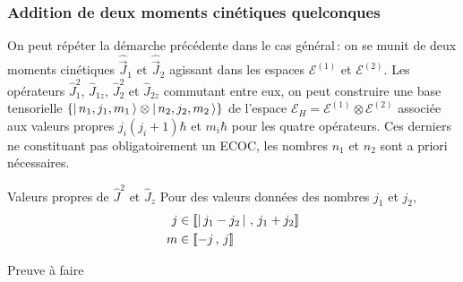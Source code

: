         \subsubsection{Addition de deux moments cinétiques quelconques}

        On peut répéter la démarche précédente dans le cas général : on se munit de deux moments cinétiques $\hat{\vec{J}}_1$ et $\hat{\vec{J}}_2$ agissant dans les espaces $\mathcal{E}^{(1)}$ et $\mathcal{E}^{(2)}$. Les opérateurs $\hat{J}_1^2$, $\hat{J}_{1z}$, $\hat{J}^2_2$ et $\hat{J}_{2z}$ commutant entre eux, on peut construire une base tensorielle $\left\{\left| \, n_1, j_1, m_1 \, \right> \otimes \left| \, n_2, j_2, m_2 \, \right>\right\}$ de l’espace $\mathcal{E}_H = \mathcal{E}^{(1)} \otimes \mathcal{E}^{(2)}$ associée  aux valeurs propres $j_{i}(j_i + 1)\hbar$ et $m_i \hbar$ pour les quatre opérateurs. Ces derniers ne constituant pas obligatoirement un ECOC, les nombres $n_1$ et $n_2$ sont a priori nécessaires.

        \begin{omed}{Valeurs propres de $\hat{J}^2$ et $\hat{J}_z$}
            Pour des valeurs données des nombres $j_1$ et $j_2$, 
            \begin{align*}
                j &\in \left[\!\left[ \left\lvert \, j_1 - j_2 \, \right\rvert \, , \, j_1 + j_2 \right]\!\right] \\
                m &\in \left[\!\left[ -j \, , \, j \right]\!\right] \\
            \end{align*}
        \end{omed}

        \begin{demo}{Preuve à faire}
            
        \end{demo}




